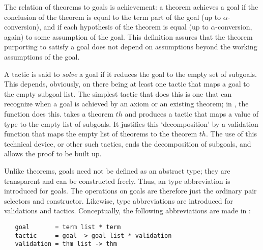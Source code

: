 The relation of theorems to goals is achievement:
a theorem achieves a goal if the conclusion of the theorem
is equal to the term part of the goal (up to $\alpha$-conversion), and
if each hypothesis of the theorem is equal (up to $\alpha$-conversion,
again) to some assumption of the goal. This definition assures that
the theorem purporting to satisfy a goal does not depend on
assumptions beyond the working assumptions of the goal.

A tactic is said to \emph{solve} a goal if it reduces the goal to the empty set of subgoals.
This depends, obviously, on there being at least one tactic that maps a goal to the empty subgoal list.
The simplest tactic that does this is one that can recognize when a goal is achieved by an axiom or an existing theorem; in \HOL, the function  does this.  takes a theorem $\mathit{th}$
and produces a tactic that maps a value of type  to the empty list of subgoals.
It justifies this `decomposition' by a validation function that maps the empty list of theorems to the theorem $\mathit{th}$.
The use of this technical device, or other such tactics, ends the decomposition of subgoals, and allows the proof to be built up.

Unlike theorems, goals need not be defined as an abstract type; they are transparent and can be constructed freely. Thus, an \ML{} type abbreviation is introduced for goals.
The operations on goals are therefore just the ordinary pair selectors and constructor.
Likewise, type abbreviations are introduced for validations and tactics. Conceptually, the following abbreviations are made in \HOL:

\begin{hol}
\begin{verbatim}
   goal       = term list * term
   tactic     = goal -> goal list * validation
   validation = thm list -> thm
\end{verbatim}
\end{hol}

